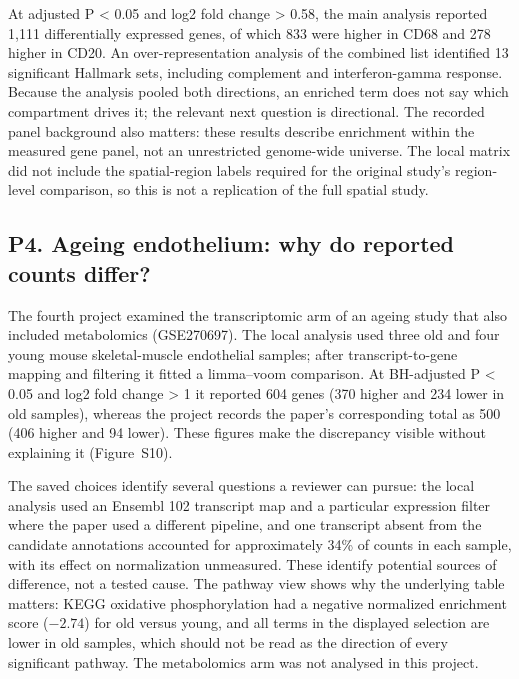 \documentclass[11pt]{article}
\begin{document}
At adjusted P \textless{} 0.05 and \textbar log2 fold change\textbar{} \textgreater{} 0.58, the main analysis reported 1,111 differentially expressed genes, of which 833 were higher in CD68 and 278 higher in CD20. An over-representation analysis of the combined list identified 13 significant Hallmark sets, including complement and interferon-gamma response. Because the analysis pooled both directions, an enriched term does not say which compartment drives it; the relevant next question is directional. The recorded panel background also matters: these results describe enrichment within the measured gene panel, not an unrestricted genome-wide universe. The local matrix did not include the spatial-region labels required for the original study's region-level comparison, so this is not a replication of the full spatial study.

\FloatBarrier

\subsection{P4. Ageing endothelium: why do reported counts differ?}\label{p4}

The fourth project examined the transcriptomic arm of an ageing study that also included metabolomics \cite{kiesworo2025} (GSE270697). The local analysis used three old and four young mouse skeletal-muscle endothelial samples; after transcript-to-gene mapping and filtering it fitted a limma--voom comparison. At BH-adjusted P \textless{} 0.05 and \textbar log2 fold change\textbar{} \textgreater{} 1 it reported 604 genes (370 higher and 234 lower in old samples), whereas the project records the paper's corresponding total as 500 (406 higher and 94 lower). These figures make the discrepancy visible without explaining it (Figure~S10).

The saved choices identify several questions a reviewer can pursue: the local analysis used an Ensembl 102 transcript map and a particular expression filter where the paper used a different pipeline, and one transcript absent from the candidate annotations accounted for approximately 34\% of counts in each sample, with its effect on normalization unmeasured. These identify potential sources of difference, not a tested cause. The pathway view shows why the underlying table matters: KEGG oxidative phosphorylation had a negative normalized enrichment score ($-2.74$) for old versus young, and all terms in the displayed selection are lower in old samples, which should not be read as the direction of every significant pathway. The metabolomics arm was not analysed in this project.
\end{document}
